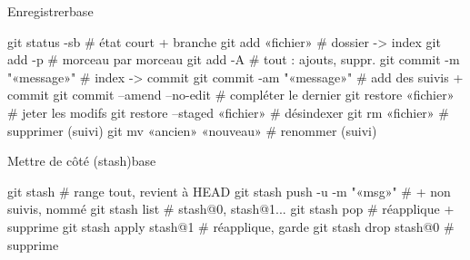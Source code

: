 \documentclass{article}
\begin{document}
\begin{colonne}
\begin{bloc}{Enregistrer}{base}
\begin{code}
git status -sb                # état court + branche
git add «fichier»               # dossier -> index
git add -p                    # morceau par morceau
git add -A                    # tout : ajouts, suppr.
git commit -m "«message»"     # index -> commit
git commit -am "«message»"    # add des suivis + commit
git commit --amend --no-edit  # compléter le dernier
git restore «fichier»           # jeter les modifs
git restore --staged «fichier»  # désindexer
git rm «fichier»                # supprimer (suivi)
git mv «ancien» «nouveau»         # renommer (suivi)
\end{code}
\end{bloc}

\begin{bloc}{Mettre de côté (stash)}{base}
\begin{code}
git stash                     # range tout, revient à HEAD
git stash push -u -m "«msg»"  # + non suivis, nommé
git stash list                # stash@{0}, stash@{1}...
git stash pop                 # réapplique + supprime
git stash apply stash@{1}     # réapplique, garde
git stash drop stash@{0}      # supprime
\end{code}
\end{bloc}
\end{colonne}\colbreak
\end{document}
